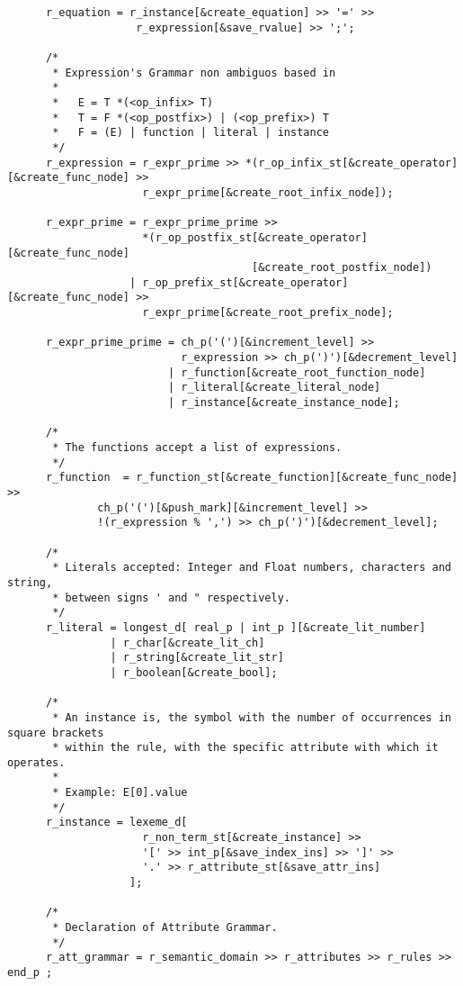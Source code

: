 \begin{center}
\begin{lstlisting}
      r_equation = r_instance[&create_equation] >> '=' >>
                    r_expression[&save_rvalue] >> ';';

      /*
       * Expression's Grammar non ambiguos based in
       *
       *   E = T *(<op_infix> T)
       *   T = F *(<op_postfix>) | (<op_prefix>) T
       *   F = (E) | function | literal | instance
       */
      r_expression = r_expr_prime >> *(r_op_infix_st[&create_operator][&create_func_node] >>
                     r_expr_prime[&create_root_infix_node]);

      r_expr_prime = r_expr_prime_prime >>
                     *(r_op_postfix_st[&create_operator][&create_func_node]
                                      [&create_root_postfix_node])
                   | r_op_prefix_st[&create_operator][&create_func_node] >>
                     r_expr_prime[&create_root_prefix_node];

      r_expr_prime_prime = ch_p('(')[&increment_level] >> 
                           r_expression >> ch_p(')')[&decrement_level]
                         | r_function[&create_root_function_node]
                         | r_literal[&create_literal_node]
                         | r_instance[&create_instance_node];

      /*
       * The functions accept a list of expressions.
       */
      r_function  = r_function_st[&create_function][&create_func_node] >>
              ch_p('(')[&push_mark][&increment_level] >>
              !(r_expression % ',') >> ch_p(')')[&decrement_level];

      /*
       * Literals accepted: Integer and Float numbers, characters and string,
       * between signs ' and " respectively.
       */
      r_literal = longest_d[ real_p | int_p ][&create_lit_number]
                | r_char[&create_lit_ch]
                | r_string[&create_lit_str]
                | r_boolean[&create_bool];

      /*
       * An instance is, the symbol with the number of occurrences in square brackets
       * within the rule, with the specific attribute with which it operates.
       *
       * Example: E[0].value
       */
      r_instance = lexeme_d[
                     r_non_term_st[&create_instance] >>
                     '[' >> int_p[&save_index_ins] >> ']' >>
                     '.' >> r_attribute_st[&save_attr_ins]
                   ];

      /*
       * Declaration of Attribute Grammar.
       */
      r_att_grammar = r_semantic_domain >> r_attributes >> r_rules >> end_p ;


\end{lstlisting}
\end{center}
